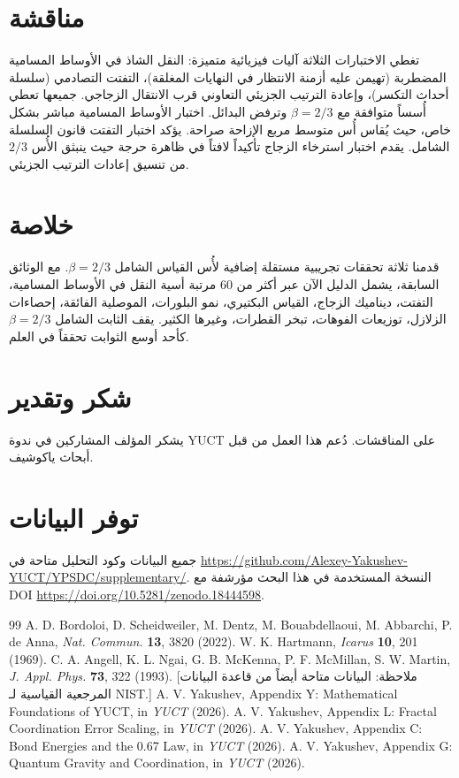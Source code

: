 \documentclass[11pt,a4paper]{article}
\newcommand{\betaf}{\beta}
\begin{document}
	\section{مناقشة}
	
	تغطي الاختبارات الثلاثة آليات فيزيائية متميزة: النقل الشاذ في الأوساط المسامية المضطربة (تهيمن عليه أزمنة الانتظار في النهايات المغلقة)، التفتت التصادمي (سلسلة أحداث التكسر)، وإعادة الترتيب الجزيئي التعاوني قرب الانتقال الزجاجي. جميعها تعطي أُسساً متوافقة مع \(\betaf = 2/3\) وترفض البدائل. اختبار الأوساط المسامية مباشر بشكل خاص، حيث يُقاس أُس متوسط مربع الإزاحة صراحة. يؤكد اختبار التفتت قانون السلسلة الشامل. يقدم اختبار استرخاء الزجاج تأكيداً لافتاً في ظاهرة حرجة حيث ينبثق الأُس \(2/3\) من تنسيق إعادات الترتيب الجزيئي.
	
	\section{خلاصة}
	
	قدمنا ثلاثة تحققات تجريبية مستقلة إضافية لأُس القياس الشامل \(\betaf = 2/3\). مع الوثائق السابقة، يشمل الدليل الآن عبر أكثر من 60 مرتبة أسية النقل في الأوساط المسامية، التفتت، ديناميك الزجاج، القياس البكتيري، نمو البلورات، الموصلية الفائقة، إحصاءات الزلازل، توزيعات الفوهات، تبخر القطرات، وغيرها الكثير. يقف الثابت الشامل \(\betaf = 2/3\) كأحد أوسع الثوابت تحققاً في العلم.
	
	\section*{شكر وتقدير}
	
	يشكر المؤلف المشاركين في ندوة YUCT على المناقشات. دُعم هذا العمل من قبل أبحاث ياكوشيف.
	
	\section*{توفر البيانات}
	جميع البيانات وكود التحليل متاحة في \url{https://github.com/Alexey-Yakushev-YUCT/YPSDC/supplementary/}. النسخة المستخدمة في هذا البحث مؤرشفة مع DOI \url{https://doi.org/10.5281/zenodo.18444598}.
	
	\begin{thebibliography}{99}
		 A. D. Bordoloi, D. Scheidweiler, M. Dentz, M. Bouabdellaoui, M. Abbarchi, P. de Anna, \emph{Nat. Commun.} \textbf{13}, 3820 (2022).
		 W. K. Hartmann, \emph{Icarus} \textbf{10}, 201 (1969).
		 C. A. Angell, K. L. Ngai, G. B. McKenna, P. F. McMillan, S. W. Martin, \emph{J. Appl. Phys.} \textbf{73}, 322 (1993). [ملاحظة: البيانات متاحة أيضاً من قاعدة البيانات المرجعية القياسية لـ NIST.]
		 A. V. Yakushev, Appendix Y: Mathematical Foundations of YUCT, in \emph{YUCT} (2026).
		 A. V. Yakushev, Appendix L: Fractal Coordination Error Scaling, in \emph{YUCT} (2026).
		 A. V. Yakushev, Appendix C: Bond Energies and the 0.67 Law, in \emph{YUCT} (2026).
		 A. V. Yakushev, Appendix G: Quantum Gravity and Coordination, in \emph{YUCT} (2026).
	\end{thebibliography}
	
\end{document}
